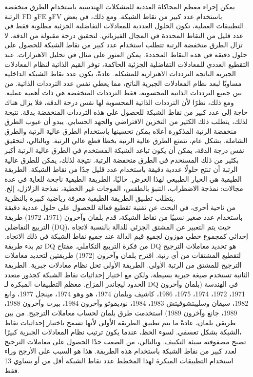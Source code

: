 \noindent
يمكن إجراء معظم المحاكاة العددية للمشكلات الهندسية باستخدام الطرق منخفضة الرتبة FD وFE وFV باستخدام عدد كبير من نقاط الشبكة. ومع ذلك، في بعض التطبيقات العملية، تكون الحلول العددية للمعادلات التفاضلية الجزئية مطلوبة فقط في عدد قليل من النقاط المحددة في المجال الفيزيائي. لتحقيق درجة مقبولة من الدقة، لا تزال الطرق منخفضة الرتبة تتطلب استخدام عدد كبير من نقاط الشبكة للحصول على حلول دقيقة في هذه النقاط المحددة. يمكن العثور على مثال في تحليل الاهتزازات. عند التقطيع العددي للمعادلات التفاضلية الجزئية الحاكمة، توفر القيم الذاتية لنظام المعادلات الجبرية الناتجة الترددات الاهتزازية للمشكلة. عادةً، يكون عدد نقاط الشبكة الداخلية مساويًا لبعد نظام المعادلات الجبرية الناتج، مما يعطي نفس عدد الترددات الذاتية. من بين جميع الترددات الذاتية المحسوبة، فقط الترددات المنخفضة هي ذات أهمية عملية. ومع ذلك، نظرًا لأن الترددات الذاتية المحسوبة لها نفس درجة الدقة، فلا يزال هناك حاجة إلى عدد كبير من نقاط الشبكة للحصول على هذه الترددات المنخفضة بدقة. نتيجة لذلك، يتطلب ذلك الكثير من التخزين الافتراضي والجهد الحسابي. يبدو أن عيوب الطرق منخفضة الرتبة المذكورة أعلاه يمكن تحسينها باستخدام الطرق عالية الرتبة والطرق الشاملة. بشكل عام، تتمتع الطرق عالية الرتبة بخطأ قطع عالي الرتبة. وبالتالي، لتحقيق نفس درجة الدقة، يمكن أن يكون تباعد الشبكة المستخدم في الطرق عالية الرتبة أكبر بكثير من ذلك المستخدم في الطرق منخفضة الرتبة. نتيجة لذلك، يمكن للطرق عالية الرتبة أن تنتج حلولًا عددية دقيقة باستخدام عدد قليل جدًا من نقاط الشبكة. الطريقة الطيفية هي الخيار الطبيعي لهذا الغرض. حاليًا، الطريقة الطيفية ناجحة للغاية في عدة مجالات: نمذجة الاضطراب، التنبؤ بالطقس، الموجات غير الخطية، نمذجة الزلازل، إلخ. يتطلب تطبيق الطريقة الطيفية معرفة رياضية كبيرة بالنظرية.\\
\noindent
من ناحية أخرى، في البحث عن تقنية تقطيع فعالة للحصول على حلول عددية دقيقة باستخدام عدد صغير نسبيًا من نقاط الشبكة، قدم بلمان وآخرون (1971، 1972) \cite{bellman_roth} \cite{Bellman} \cite{bert} طريقة التربيع التفاضلي (DQ)، حيث يتم التعبير عن المشتق الجزئي للدالة بالنسبة لاتجاه إحداثي كمجموع خطي موزون لجميع قيم الدالة عند جميع نقاط الشبكة في ذلك الاتجاه. تم بدء طريقة DQ من فكرة التربيع التكاملي. مفتاح DQ هو تحديد معاملات الترجيح لتقطيع المشتقات من أي رتبة. اقترح بلمان وآخرون (1972) طريقتين لتحديد معاملات الترجيح للمشتق من الرتبة الأولى. الطريقة الأولى تحل نظام معادلات جبرية. الطريقة الثانية تستخدم صيغة جبرية بسيطة، ولكن مع اختيار إحداثيات نقاط الشبكة كجذور متعدد الحدود ليجاندر المزاح. معظم التطبيقات المبكرة لـ DQ في الهندسة (بلمان وآخرون 1971، 1972، 1974، 1975، 1986، كاشيف وبلمان 1974، هو وهو 1974، مينجل 1977، وانغ 1982، سيفان وسليبتشوفيتش 1983، 1984، نوديموثو وآخرون 1984، بيرت وآخرون 1988، 1989، جانغ وآخرون 1989) استخدمت طرق بلمان لحساب معاملات الترجيح. من بين طريقي بلمان، عادةً ما يتم تطبيق الطريقة الأولى لأنها تسمح باختيار إحداثيات نقاط الشبكة بشكل تعسفي. لسوء الحظ، عندما يكون ترتيب نظام المعادلات الجبرية كبيرًا،\\
\noindent
تصبح مصفوفته سيئة التكييف. وبالتالي، من الصعب جدًا الحصول على معاملات الترجيح لعدد كبير من نقاط الشبكة باستخدام هذه الطريقة. هذا هو السبب على الأرجح وراء استخدام التطبيقات المبكرة لهذا المخطط عدد نقاط الشبكة أقل من أو يساوي 13 فقط. 